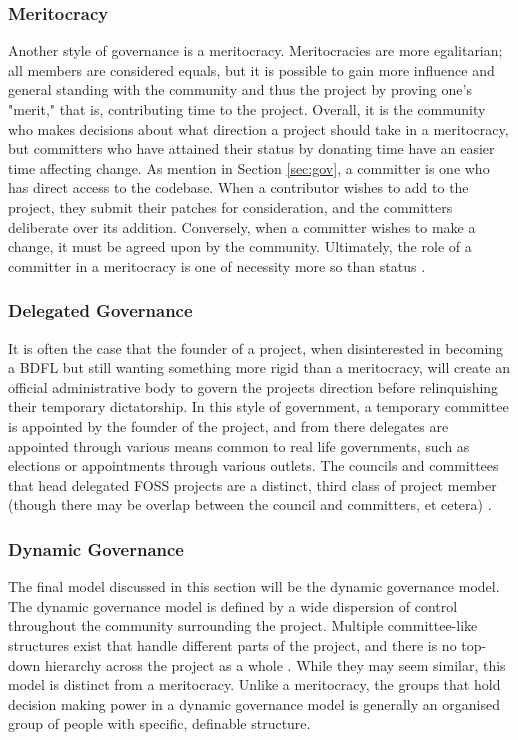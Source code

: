 \documentclass[manuscript,screen,nonacm,12pt]{acmart}
\begin{document}
\subsubsection{Meritocracy}
Another style of governance is a meritocracy. Meritocracies are more
egalitarian; all members are considered equals, but it is possible to gain more
influence and general standing with the community and thus the project by
proving one's "merit," that is, contributing time to the project. Overall, it is
the community who makes decisions about what direction a project should take in
a meritocracy, but committers who have attained their status by donating time
have an easier time affecting change. As mention in Section \ref{sec:gov}, a
committer is one who has direct access to the codebase. When a contributor
wishes to add to the project, they submit their patches for consideration, and
the committers deliberate over its addition. Conversely, when a committer wishes
to make a change, it must be agreed upon by the community. Ultimately, the role
of a committer in a meritocracy is one of necessity more so than status
\cite{Ritvo2017}.

\subsubsection{Delegated Governance}
It is often the case that the founder of a project, when disinterested in
becoming a BDFL but still wanting something more rigid than a meritocracy, will
create an official administrative body to govern the projects direction before
relinquishing their temporary dictatorship. In this style of government, a
temporary committee is appointed by the founder of the project, and from there
delegates are appointed through various means common to real life governments,
such as elections or appointments through various outlets. The councils and
committees that head delegated FOSS projects are a distinct, third class of
project member (though there may be overlap between the council and committers,
et cetera) \cite{Ritvo2017}.

\subsubsection{Dynamic Governance}
The final model discussed in this section will be the dynamic governance model.
The dynamic governance model is defined by a wide dispersion of control
throughout the community surrounding the project. Multiple committee-like
structures exist that handle different parts of the project, and there is no
top-down hierarchy across the project as a whole \cite{Ritvo2017}. While they
may seem similar, this model is distinct from a meritocracy. Unlike a
meritocracy, the groups that hold decision making power in a dynamic governance
model is generally an organised group of people with specific, definable
structure.
\end{document}
